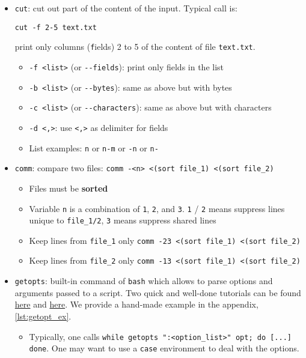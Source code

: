 \documentclass[a4paper,12pt,%
              final%
              ]{article}
\begin{document}
\begin{itemize}
\begin{itemize}
    \end{itemize}
  \item \texttt{cut}: cut out part of the content of the input. Typical call is:
\begin{verbatim}
cut -f 2-5 text.txt
\end{verbatim}
    print only columns (\texttt{f}ields) 2 to 5 of the content of file \verb|text.txt|.
    \begin{itemize}
      \item \verb|-f <list>| (or \verb|--fields|): print only fields in the list
      \item \verb|-b <list>| (or \verb|--bytes|): same as above but with bytes
      \item \verb|-c <list>| (or \verb|--characters|): same as above but with characters
      \item \verb|-d <,>|: use \verb|<,>| as delimiter for fields
      \item List examples: \texttt{n} or \texttt{n-m} or \texttt{-n} or \texttt{n-}
    \end{itemize}
  \item \texttt{comm}: compare two files: \verb|comm -<n> <(sort file_1) <(sort file_2)|
    \begin{itemize}
      \item Files must be \textbf{sorted}
      \item Variable \texttt{n} is a combination of \texttt{1}, \texttt{2}, and \texttt{3}. \texttt{1} / \texttt{2} means suppress lines unique to \verb|file_1/2|, \texttt{3} means suppress shared lines
      \item Keep lines from \verb|file_1| only \verb|comm -23 <(sort file_1) <(sort file_2)|
      \item Keep lines from \verb|file_2| only \verb|comm -13 <(sort file_1) <(sort file_2)|
    \end{itemize}
  \item \texttt{getopts}: built-in command of \texttt{bash} which allows to parse options and arguments passed to a script. Two quick and well-done tutorials can be found \href{https://www.computerhope.com/unix/bash/getopts.htm}{here} and \href{https://sookocheff.com/post/bash/parsing-bash-script-arguments-with-shopts/}{here}. We provide a hand-made example in the appendix, \autoref{lst:getopt_ex}.
    \begin{itemize}
      \item Typically, one calls \verb|while getopts ":<option_list>" opt; do [...] done|. One may want to use a \verb|case| environment to deal with the options.

\end{itemize}
\end{itemize}
\end{document}

